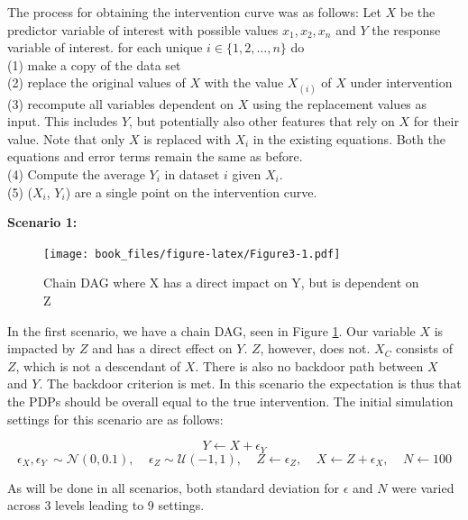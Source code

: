 \documentclass[]{krantz}
\begin{document}
The process for obtaining the intervention curve was as follows: Let
\(X\) be the predictor variable of interest with possible values
\(x_{1}, x_{2}, x_{n}\) and \(Y\) the response variable of interest. for
each unique \(i \in \{1,2,\dots,n\}\) do\\
(1) make a copy of the data set\\
(2) replace the original values of \(X\) with the value \(X_{(i)}\) of
\(X\) under intervention\\
(3) recompute all variables dependent on \(X\) using the replacement
values as input. This includes \(Y\), but potentially also other
features that rely on \(X\) for their value. Note that only \(X\) is
replaced with \(X_i\) in the existing equations. Both the equations and
error terms remain the same as before.\\
(4) Compute the average \(Y_i\) in dataset \(i\) given \(X_i\).\\
(5) (\(X_i\), \(Y_i\)) are a single point on the intervention curve.

\textbf{Scenario 1: }

\begin{figure}
\centering
\texttt{[image: book\_files/figure-latex/Figure3-1.pdf]}
\caption{\label{fig:Figure3}Chain DAG where X has a direct impact on Y, but
is dependent on Z}
\end{figure}

In the first scenario, we have a chain DAG, seen in Figure
\ref{fig:Figure3}. Our variable \(X\) is impacted by \(Z\) and has a
direct effect on \(Y\). \(Z\), however, does not. \(X_C\) consists of
\(Z\), which is not a descendant of \(X\). There is also no backdoor
path between \(X\) and \(Y\). The backdoor criterion is met. In this
scenario the expectation is thus that the PDPs should be overall equal
to the true intervention. The initial simulation settings for this
scenario are as follows:

\[ Y \leftarrow X + \epsilon_Y  \]
\[ \epsilon_X,\epsilon_Y ~ \sim \mathcal{N}(0, 0.1), \ \ \ \ \ \epsilon_Z \sim \mathcal{U}(-1,1),\ \ \ \ \ Z \leftarrow \epsilon_Z, \ \ \ \ \ X \leftarrow Z + \epsilon_X, \ \ \ \ \ N \leftarrow 100 \]

As will be done in all scenarios, both standard deviation for
\(\epsilon\) and \(N\) were varied across 3 levels leading to 9
settings.
\end{document}
